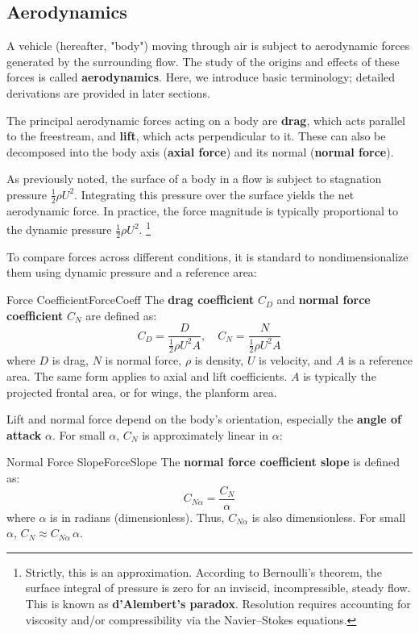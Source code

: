 \documentclass[uplatex,dvipdfmx,a4paper,11pt]{report}
\newcommand{\keyword}[1]{\textcolor{mainblue}{\textbf{#1}}}
\numberwithin{equation}{chapter}
\begin{document}

\subsection{Aerodynamics}
A vehicle (hereafter, "body") moving through air is subject to aerodynamic forces generated by the surrounding flow. The study of the origins and effects of these forces is called \keyword{aerodynamics}. Here, we introduce basic terminology; detailed derivations are provided in later sections.

\enskip

The principal aerodynamic forces acting on a body are \keyword{drag}, which acts parallel to the freestream, and \keyword{lift}, which acts perpendicular to it. These can also be decomposed into the body axis (\keyword{axial force}) and its normal (\keyword{normal force}).

As previously noted, the surface of a body in a flow is subject to stagnation pressure $\frac{1}{2}\rho U^{2}$. Integrating this pressure over the surface yields the net aerodynamic force. In practice, the force magnitude is typically proportional to the dynamic pressure $\frac{1}{2}\rho U^{2}$.
\footnote{Strictly, this is an approximation. According to Bernoulli's theorem, the surface integral of pressure is zero for an inviscid, incompressible, steady flow. This is known as \keyword{d'Alembert's paradox}. Resolution requires accounting for viscosity and/or compressibility via the Navier--Stokes equations.}

To compare forces across different conditions, it is standard to nondimensionalize them using dynamic pressure and a reference area:
\begin{definition}{Force Coefficient}{ForceCoeff}{}
  The \keyword{drag coefficient} $C_D$ and \keyword{normal force coefficient} $C_N$ are defined as:
  \begin{equation}
    C_D = \frac{D}{\frac{1}{2}\rho U^{2}A}, \quad C_N = \frac{N}{\frac{1}{2}\rho U^{2}A}
  \end{equation}
  where $D$ is drag, $N$ is normal force, $\rho$ is density, $U$ is velocity, and $A$ is a reference area. The same form applies to axial and lift coefficients. $A$ is typically the projected frontal area, or for wings, the planform area.
\end{definition}

Lift and normal force depend on the body's orientation, especially the \keyword{angle of attack} $\alpha$. For small $\alpha$, $C_N$ is approximately linear in $\alpha$:
\begin{definition}{Normal Force Slope}{ForceSlope}{}
  The \keyword{normal force coefficient slope} is defined as:
  \begin{equation}
    C_{N\alpha} = \frac{C_N}{\alpha}
  \end{equation}
  where $\alpha$ is in radians (dimensionless). Thus, $C_{N\alpha}$ is also dimensionless. For small $\alpha$, $C_N \approx C_{N\alpha}\,\alpha$.
\end{definition}
\end{document}
